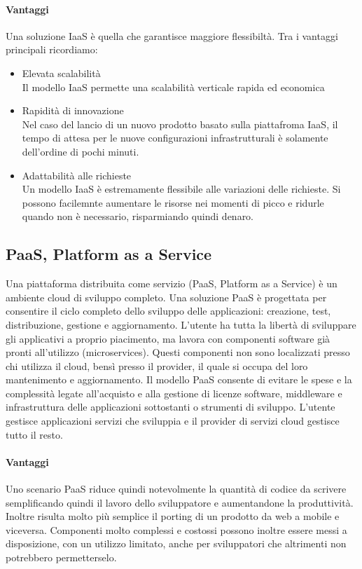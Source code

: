 \paragraph{Vantaggi}
Una soluzione IaaS è quella che garantisce maggiore flessibiltà. Tra i vantaggi principali ricordiamo:
\begin{itemize}
	\item  Elevata scalabilità \\
	Il modello IaaS permette una scalabilità verticale rapida ed economica
	\item Rapidità di innovazione \\
	Nel caso del lancio di un nuovo prodotto basato sulla piattafroma IaaS, il tempo di attesa per le nuove configurazioni infrastrutturali è solamente dell'ordine di pochi minuti.
	\item Adattabilità alle richieste \\
	Un modello IaaS è estremamente flessibile alle variazioni delle richieste. Si possono facilemnte aumentare le risorse nei momenti di picco e ridurle quando non è necessario, risparmiando quindi denaro.
	
\end{itemize}
\subsection{PaaS, Platform as a Service}
Una piattaforma distribuita come servizio (PaaS, Platform as a Service) è un ambiente cloud di sviluppo completo. Una soluzione PaaS è progettata per consentire il ciclo completo dello sviluppo delle applicazioni: creazione, test, distribuzione, gestione e aggiornamento. L'utente ha tutta la libertà di sviluppare gli applicativi a proprio piacimento, ma lavora con componenti software già pronti all'utilizzo (microservices). Questi componenti non sono localizzati presso chi utilizza il cloud, bensì presso il provider, il quale si occupa del loro mantenimento e aggiornamento. Il modello PaaS consente di evitare le spese e la complessità legate all'acquisto e alla gestione di licenze software, middleware e infrastruttura delle applicazioni sottostanti o strumenti di sviluppo. L'utente gestisce applicazioni servizi che sviluppia e il provider di servizi cloud gestisce tutto il resto.
\paragraph{Vantaggi}
Uno scenario PaaS riduce quindi notevolmente la quantità di codice da scrivere semplificando quindi il lavoro dello sviluppatore e aumentandone la produttività. Inoltre risulta molto più semplice il porting di un prodotto da web a mobile e viceversa. Componenti molto complessi e costossi possono inoltre essere messi a disposizione, con un utilizzo limitato, anche per sviluppatori che altrimenti non potrebbero permetterselo. 
